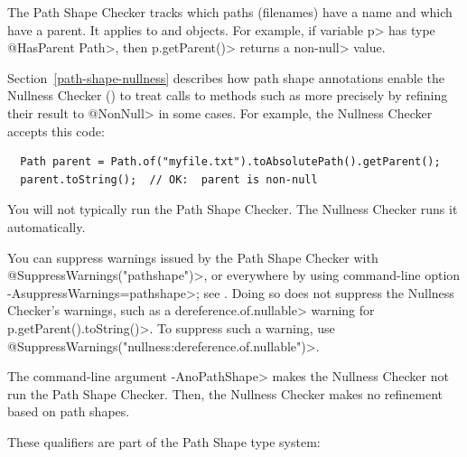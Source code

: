 
The Path Shape Checker tracks which paths (filenames) have a name and which have a
parent.  It applies to
 and
 objects.  For example, if
variable \<p> has type \<@HasParent Path>, then \<p.getParent()> returns a
non-\<null> value.

Section~\ref{path-shape-nullness} describes how path shape annotations
enable the Nullness Checker () to treat
calls to methods such as
more precisely by refining their result to \<@NonNull> in some cases.
For example, the Nullness Checker accepts this code:

\begin{Verbatim}
  Path parent = Path.of("myfile.txt").toAbsolutePath().getParent();
  parent.toString();  // OK:  parent is non-null
\end{Verbatim}



You will not typically run the Path Shape Checker.  The Nullness Checker
runs it automatically.

You can suppress warnings issued by the Path Shape Checker with
\<@SuppressWarnings("pathshape")>, or everywhere by using command-line option
\<-AsuppressWarnings=pathshape>; see .
Doing so does not suppress the Nullness Checker's warnings, such as a
\<dereference.of.nullable> warning for \<p.getParent().toString()>.  To
suppress such a warning, use \<@SuppressWarnings("nullness:dereference.of.nullable")>.

The command-line argument \<-AnoPathShape> makes the Nullness Checker
not run the Path Shape Checker.  Then, the Nullness Checker makes no
refinement based on path shapes.



These qualifiers are part of the Path Shape type system:

